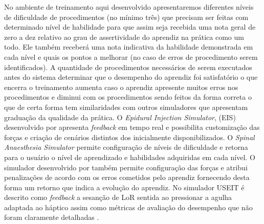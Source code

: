 No ambiente de treinamento aqui desenvolvido apresentaremos diferentes níveis de dificuldade de procedimentos (no mínimo três) que precisam ser feitas com determinado nível de habilidade para que assim seja recebida uma nota geral de zero a dez relativo ao grau de assertividade do aprendiz na prática como um todo. Ele também receberá uma nota indicativa da habilidade demonstrada em cada nível e quais os pontos a melhorar (no caso de erros de procedimento serem identificados). A quantidade de procedimentos necessários de serem executados antes do sistema determinar que o desempenho do aprendiz foi satisfatório o que encerra o treinamento aumenta caso o aprendiz apresente muitos erros nos procedimentos e diminui com os procedimentos sendo feitos da forma correta o que de certa forma tem similaridades com outros simuladores que apresentam graduação da qualidade da prática. O \textit{Epidural Injection Simulator}, (EIS) desenvolvido por \textcite{Wilson2003} apresenta \textit{feedback} em tempo real e possibilita customização das forças e criação de cenários distintos dos inicialmente disponibilizados. O \textit{Spinal Anaesthesia Simulator} \cite{Albert2007,Dreifaldt2006} permite configuração de níveis de dificuldade e retorna para o usuário o nível de aprendizado e habilidades adquiridas em cada nível. O simulador desenvolvido por \textcite{Brazil2017thesis} também permite configuração das forças e atribui penalizações de acordo com os erros cometidos pelo aprendiz fornecendo desta forma um retorno que indica a evolução do aprendiz. No simulador USEIT é descrito como \textit{feedback} a sesanção de \acrshort{LoR} sentida ao pressionar a agulha adaptada ao háptico assim como métricas de avaliação do desempenho que não foram claramente detalhadas \cite{Moo-Young202}. 
